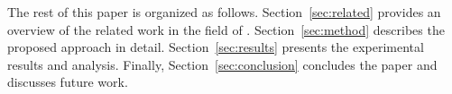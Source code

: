     
    

The rest of this paper is organized as follows.
Section~\ref{sec:related} provides an overview of the related work in the field of .
Section~\ref{sec:method} describes the proposed approach in detail.
Section~\ref{sec:results} presents the experimental results and analysis.
Finally, Section~\ref{sec:conclusion} concludes the paper and discusses future work.




